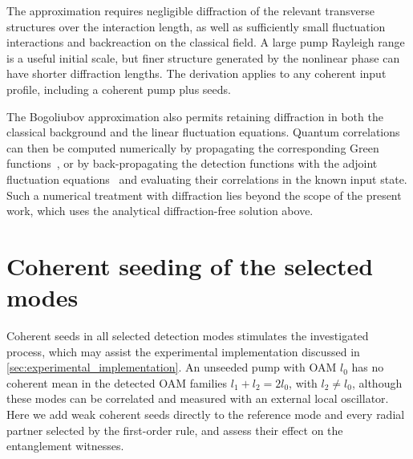 \documentclass[%
 reprint,
 amsmath,amssymb,
 aps,
pra,
twocolumn,
]{revtex4-2}
\begin{document}
The approximation requires negligible diffraction of the relevant transverse structures over the interaction length, as well as sufficiently small fluctuation interactions and backreaction on the classical field. A large pump Rayleigh range is a useful initial scale, but finer structure generated by the nonlinear phase can have shorter diffraction lengths. The derivation applies to any coherent input profile, including a coherent pump plus seeds.

The Bogoliubov approximation also permits retaining diffraction in both the classical background and the linear fluctuation equations. Quantum correlations can then be computed numerically by propagating the corresponding Green functions~\cite{PhysRevA.62.033816, Eric_Lantz_2004}, or by back-propagating the detection functions with the adjoint fluctuation equations~\cite{PhysRevA.51.817, Ray_Kuang_Lee_2004} and evaluating their correlations in the known input state. Such a numerical treatment with diffraction lies beyond the scope of the present work, which uses the analytical diffraction-free solution above.

\section{Coherent seeding of the selected modes}
\label{app:coherent_seed}

Coherent seeds in all selected detection modes stimulates the investigated process, which may assist the experimental implementation discussed in \ref{sec:experimental_implementation}. An unseeded pump with OAM $l_0$ has no coherent mean in the detected OAM families $l_1+l_2=2l_0$, with $l_2\ne l_0$, although these modes can be correlated and measured with an external local oscillator. Here we add weak coherent seeds directly to the reference mode and every radial partner selected by the first-order rule, and assess their effect on the entanglement witnesses.
\end{document}
